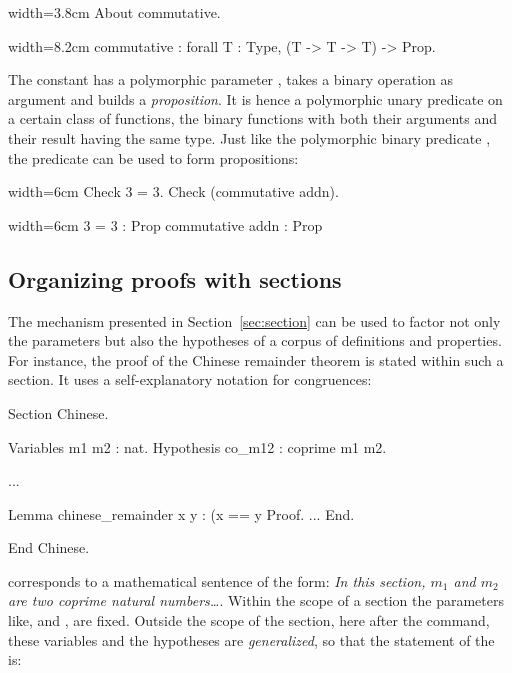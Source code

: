 \begin{coq}{}{width=3.8cm}
About commutative.
\end{coq}
\begin{coqout}{}{width=8.2cm}
commutative : forall T : Type, (T -> T -> T) -> Prop.
\end{coqout}
The constant  has a polymorphic parameter ,
takes a binary operation as argument and builds a
\emph{proposition}. It is hence a polymorphic unary predicate on
a certain class of functions, the binary functions with both their
arguments and their result having the same type. Just like the
polymorphic binary predicate , the predicate  can
be used to form propositions:

\begin{coq}{}{width=6cm}
Check 3 = 3.
Check (commutative addn).
\end{coq}
\begin{coqout}{}{width=6cm}
3 = 3 : Prop
commutative addn : Prop
\end{coqout}


\subsection{Organizing proofs with sections}

The  mechanism presented in Section~\ref{sec:section} can
be used to factor not only the parameters but also the hypotheses of a
corpus of definitions and properties. For instance, the proof of the
Chinese remainder theorem is stated within such a section. It uses a
self-explanatory notation for congruences:

\begin{coq}{}{}
Section Chinese.

Variables m1 m2 : nat.
Hypothesis co_m12 : coprime m1 m2.

...

Lemma chinese_remainder x y :
  (x == y %
Proof.
...
End.

End Chinese.
\end{coq}
corresponds to a mathematical sentence of the form: \emph{In this section,
  $m_1$ and $m_2$ are two coprime natural numbers\dots}. Within the
scope of a section the parameters like,  and , are
fixed. Outside the scope of the section, here after the
 command, these variables and the hypotheses are
\emph{generalized}, so that the statement of the  is:

